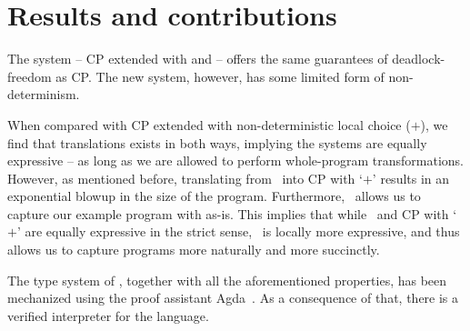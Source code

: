 \documentclass[a4paper,UKenglish]{article}
\begin{document}
\section*{Results and contributions}
The system \cpnd -- CP extended with  and  -- offers
the same guarantees of deadlock-freedom as CP. 
The new system, however, has some limited form of non-determinism.

When compared with CP extended with non-deterministic local choice ($+$), we
find that translations exists in both ways, implying the systems are equally
expressive -- as long as we are allowed to perform whole-program
transformations.
However, as mentioned before, translating from \cpnd\ into CP with `$+$' results
in an exponential blowup in the size of the program.
Furthermore, \cpnd\ allows us to capture our example program with as-is.
This implies that while \cpnd\ and CP with `$+$' are equally expressive in the
strict sense, \cpnd\ is locally more expressive, and thus allows us to capture
programs more naturally and more succinctly.
 
The type system of \cpnd, together with all the aforementioned properties,
has been mechanized using the proof assistant Agda~\cite{norell2009}.
As a consequence of that, there is a verified interpreter for the language.

\clearpage


\end{document}
